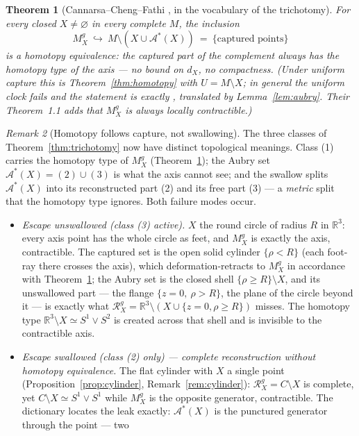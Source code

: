 \documentclass[11pt]{article}
\newtheorem{theorem}{Theorem}[section]
\theoremstyle{remark}
\newtheorem{remark}[theorem]{Remark}
\newcommand{\R}{\mathbb{R}}
\newcommand{\X}{X}
\newcommand{\Mg}{M^{g}_{\X}}
\newcommand{\Rg}{\mathcal{R}^{g}_{\X}}
\newcommand{\dX}{d_{\X}}
\newcommand{\Aub}{\mathcal{A}^{\ast}}
\begin{document}
\begin{theorem}[{Cannarsa--Cheng--Fathi \cite[Thm.~1.6]{CCF}, in
the vocabulary of the trichotomy}]\label{thm:ccf}
For every closed $\X\neq\varnothing$ in every complete $M$, the
inclusion
\[
  \Mg\ \hookrightarrow\ M\setminus(\X\cup\Aub(\X))\ =\
  \{\text{captured points}\}
\]
is a homotopy equivalence: \emph{the captured part of the complement
always has the homotopy type of the axis} --- no bound on $\dX$, no
compactness. (Under uniform capture this is
Theorem~\ref{thm:homotopy} with $U=M\setminus\X$; in general the
uniform clock fails and the statement is exactly
\cite[Thm.~1.6]{CCF}, translated by Lemma~\ref{lem:aubry}. Their
Theorem~1.1 adds that $\Mg$ is always locally contractible.)
\end{theorem}

\begin{remark}[Homotopy follows capture, not swallowing]
\label{rem:homotopyleak}
The three classes of Theorem~\ref{thm:trichotomy} now have distinct
topological meanings. Class (1) carries the homotopy type of $\Mg$
(Theorem~\ref{thm:ccf}); the Aubry set
$\Aub(\X)=(2)\cup(3)$ is what the axis cannot see; and the swallow
splits $\Aub(\X)$ into its reconstructed part (2) and its free part
(3) --- a \emph{metric} split that the homotopy type ignores. Both
failure modes occur.
\begin{itemize}
\item\emph{Escape unswallowed (class (3) active).} $\X$ the round
circle of radius $R$ in $\R^{3}$: every axis point has the whole
circle as feet, and $\Mg$ is exactly the axis, contractible. The
captured set is the open solid cylinder $\{\rho<R\}$ (each foot-ray
there crosses the axis), which deformation-retracts to $\Mg$ in
accordance with Theorem~\ref{thm:ccf}; the Aubry set is the closed
shell $\{\rho\ge R\}\setminus\X$, and its unswallowed part --- the
flange $\{z=0,\ \rho>R\}$, the plane of the circle beyond it --- is
exactly what $\Rg=\R^{3}\setminus(\X\cup\{z=0,\rho\ge R\})$
misses. The homotopy type $\R^{3}\setminus\X\simeq
S^{1}\vee S^{2}$ is created across that shell and is invisible to
the contractible axis.
\item\emph{Escape swallowed (class (2) only) --- complete
reconstruction without homotopy equivalence.} The flat cylinder
with $\X$ a single point (Proposition~\ref{prop:cylinder},
Remark~\ref{rem:cylinder}): $\Rg=C\setminus\X$ is complete, yet
$C\setminus\X\simeq S^{1}\vee S^{1}$ while $\Mg$ is the opposite
generator, contractible. The dictionary locates the leak exactly:
$\Aub(\X)$ is the punctured generator through the point --- two

\end{itemize}
\end{remark}
\end{document}
